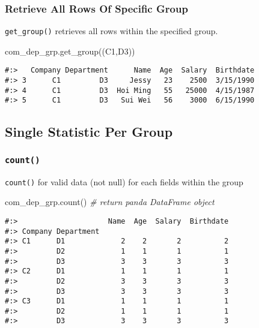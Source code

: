 \documentclass[
]{book}
\newenvironment{Shaded}{\begin{snugshade}}{\end{snugshade}}
\newcommand{\CommentTok}[1]{\textcolor[rgb]{0.37,0.37,0.37}{\textit{#1}}}
\newcommand{\NormalTok}[1]{#1}
\newcommand{\StringTok}[1]{\textcolor[rgb]{0.5,0.5,0.5}{#1}}
\begin{document}
\hypertarget{retrieve-all-rows-of-specific-group}{%
\subsubsection{Retrieve All Rows Of Specific Group}\label{retrieve-all-rows-of-specific-group}}

\texttt{get\_group()} retrieves all rows within the specified group.

\begin{Shaded}
\begin{Highlighting}[]
\NormalTok{com\_dep\_grp.get\_group((}\StringTok{\textquotesingle{}C1\textquotesingle{}}\NormalTok{,}\StringTok{\textquotesingle{}D3\textquotesingle{}}\NormalTok{))}
\end{Highlighting}
\end{Shaded}

\begin{verbatim}
#:>   Company Department      Name  Age  Salary  Birthdate
#:> 3      C1         D3     Jessy   23    2500  3/15/1990
#:> 4      C1         D3  Hoi Ming   55   25000  4/15/1987
#:> 5      C1         D3   Sui Wei   56    3000  6/15/1990
\end{verbatim}

\hypertarget{single-statistic-per-group}{%
\subsection{Single Statistic Per Group}\label{single-statistic-per-group}}

\hypertarget{count}{%
\subsubsection{\texorpdfstring{\texttt{count()}}{count()}}\label{count}}

\texttt{count()} for valid data (not null) for each fields within the group

\begin{Shaded}
\begin{Highlighting}[]
\NormalTok{com\_dep\_grp.count()  }\CommentTok{\# return panda DataFrame object}
\end{Highlighting}
\end{Shaded}

\begin{verbatim}
#:>                     Name  Age  Salary  Birthdate
#:> Company Department                              
#:> C1      D1             2    2       2          2
#:>         D2             1    1       1          1
#:>         D3             3    3       3          3
#:> C2      D1             1    1       1          1
#:>         D2             3    3       3          3
#:>         D3             3    3       3          3
#:> C3      D1             1    1       1          1
#:>         D2             1    1       1          1
#:>         D3             3    3       3          3
\end{verbatim}
\end{document}
